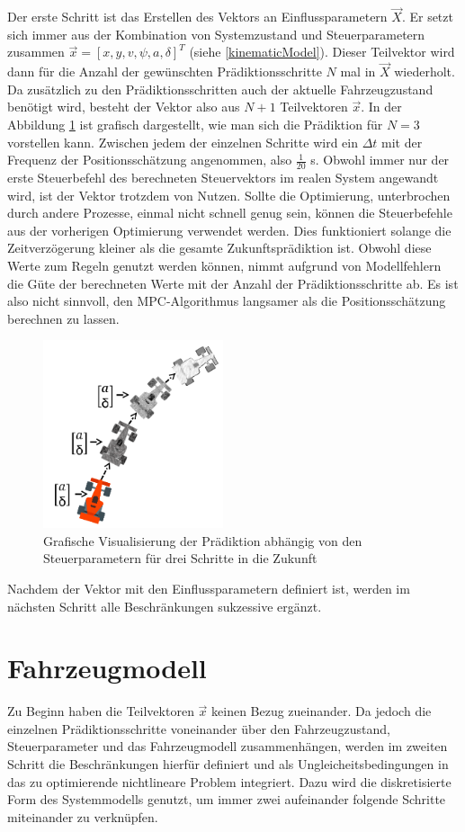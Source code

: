 \documentclass{like}
\begin{document}
Der erste Schritt ist das Erstellen des Vektors an Einflussparametern $\vec{X}$. Er setzt sich immer aus der Kombination von Systemzustand und Steuerparametern zusammen  $\vec{x} = [x, y, v, \psi, a, \delta ]^T $ (siehe \ref{kinematicModel}). 
Dieser Teilvektor wird dann für die Anzahl der gewünschten Prädiktionsschritte \(N\) mal in $\vec{X}$ wiederholt. Da zusätzlich zu den Prädiktionsschritten auch der aktuelle Fahrzeugzustand benötigt wird, besteht der Vektor also aus $N+1$ Teilvektoren $\vec{x}$. In der Abbildung \ref{fig:predictionMpc} ist grafisch dargestellt, wie man sich die Prädiktion für $N=3$ vorstellen kann. Zwischen jedem der einzelnen Schritte wird ein $\Delta t$ mit der Frequenz der Positionsschätzung angenommen, also $\frac{1}{20}$ s. Obwohl immer nur der erste Steuerbefehl des berechneten Steuervektors im realen System angewandt wird, ist der Vektor trotzdem von Nutzen. Sollte die Optimierung, unterbrochen durch andere Prozesse, einmal nicht schnell genug sein, können die Steuerbefehle aus der vorherigen Optimierung verwendet werden. Dies funktioniert solange die Zeitverzögerung kleiner als die gesamte Zukunftsprädiktion ist. Obwohl diese Werte zum Regeln genutzt werden können, nimmt aufgrund von Modellfehlern die Güte der berechneten Werte mit der Anzahl der Prädiktionsschritte ab. Es ist also nicht sinnvoll, den \ac{MPC}-Algorithmus langsamer als die Positionsschätzung berechnen zu lassen. 

  
\begin{figure}[ht!]
	\centering
	\includegraphics[width=150pt]{Abbildungen/prediction.png}
	\caption{Grafische Visualisierung der Prädiktion abhängig von den Steuerparametern für drei Schritte in die Zukunft}
	\label{fig:predictionMpc}
\end{figure}
Nachdem der Vektor mit den Einflussparametern definiert ist, werden im nächsten Schritt alle Beschränkungen sukzessive ergänzt.

\section{Fahrzeugmodell}
Zu Beginn haben die Teilvektoren $\vec{x}$ keinen Bezug zueinander. Da jedoch die einzelnen Prädiktionsschritte voneinander über den Fahrzeugzustand, Steuerparameter und das Fahrzeugmodell zusammenhängen, werden im zweiten Schritt die Beschränkungen hierfür definiert und als Ungleicheitsbedingungen in das zu optimierende nichtlineare Problem integriert. Dazu wird die diskretisierte Form des Systemmodells genutzt, um immer zwei aufeinander folgende Schritte miteinander zu verknüpfen. 
\end{document}
